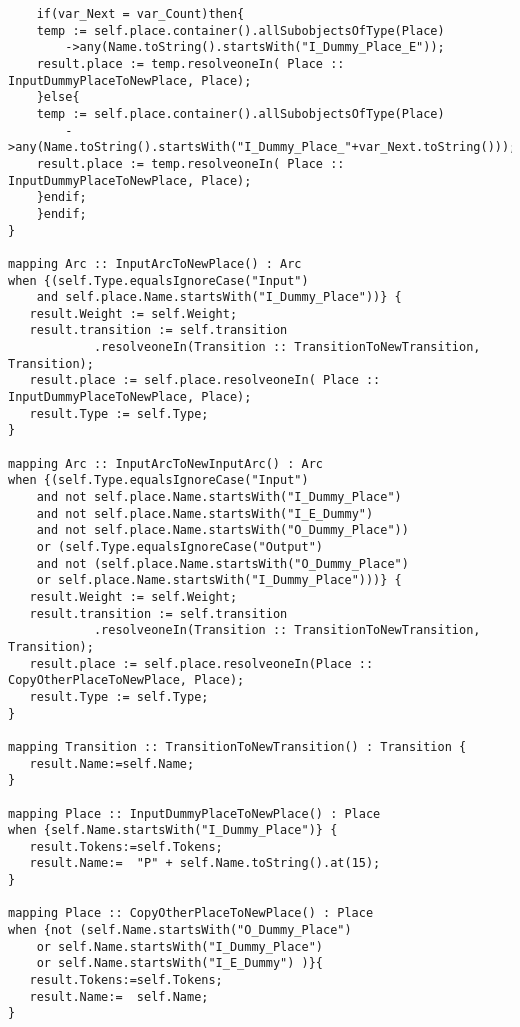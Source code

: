 \begin{verbatim}
	if(var_Next = var_Count)then{
	temp := self.place.container().allSubobjectsOfType(Place)
		->any(Name.toString().startsWith("I_Dummy_Place_E"));
	result.place := temp.resolveoneIn( Place :: InputDummyPlaceToNewPlace, Place);
	}else{   
	temp := self.place.container().allSubobjectsOfType(Place)
		->any(Name.toString().startsWith("I_Dummy_Place_"+var_Next.toString()));
	result.place := temp.resolveoneIn( Place :: InputDummyPlaceToNewPlace, Place);
	}endif;
	}endif;     
}

mapping Arc :: InputArcToNewPlace() : Arc
when {(self.Type.equalsIgnoreCase("Input") 
	and self.place.Name.startsWith("I_Dummy_Place"))} {
   result.Weight := self.Weight;
   result.transition := self.transition
			.resolveoneIn(Transition :: TransitionToNewTransition, Transition);
   result.place := self.place.resolveoneIn( Place :: InputDummyPlaceToNewPlace, Place);
   result.Type := self.Type;      
}

mapping Arc :: InputArcToNewInputArc() : Arc
when {(self.Type.equalsIgnoreCase("Input") 
	and not self.place.Name.startsWith("I_Dummy_Place") 
	and not self.place.Name.startsWith("I_E_Dummy") 
	and not self.place.Name.startsWith("O_Dummy_Place")) 
	or (self.Type.equalsIgnoreCase("Output") 
	and not (self.place.Name.startsWith("O_Dummy_Place")
	or self.place.Name.startsWith("I_Dummy_Place")))} {
   result.Weight := self.Weight;
   result.transition := self.transition
			.resolveoneIn(Transition :: TransitionToNewTransition, Transition);
   result.place := self.place.resolveoneIn(Place :: CopyOtherPlaceToNewPlace, Place);
   result.Type := self.Type;      
}

mapping Transition :: TransitionToNewTransition() : Transition {
   result.Name:=self.Name;         
}	
	
mapping Place :: InputDummyPlaceToNewPlace() : Place
when {self.Name.startsWith("I_Dummy_Place")} {
   result.Tokens:=self.Tokens;
   result.Name:=  "P" + self.Name.toString().at(15);      
}

mapping Place :: CopyOtherPlaceToNewPlace() : Place 
when {not (self.Name.startsWith("O_Dummy_Place")
 	or self.Name.startsWith("I_Dummy_Place")
 	or self.Name.startsWith("I_E_Dummy") )}{
   result.Tokens:=self.Tokens;
   result.Name:=  self.Name;     
}			
\end{verbatim}

